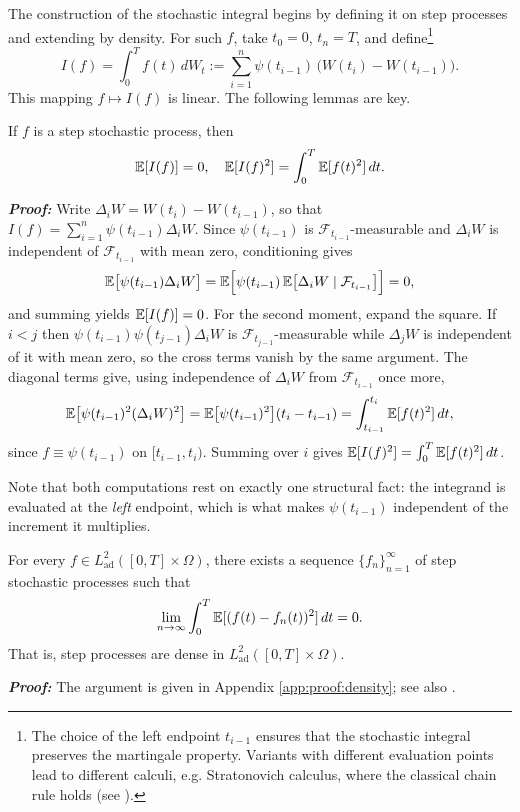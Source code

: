 \medskip

The construction of the stochastic integral begins by defining it on step processes and extending by density. For such $f$, take $t_0=0$, $t_n=T$, and define\footnote{The choice of the left endpoint $t_{i-1}$ ensures that the stochastic integral preserves the martingale property. Variants with different evaluation points lead to different calculi, e.g. Stratonovich calculus, where the classical chain rule holds (see \cite{kuo2006}).}
\begin{equation}\label{eq:integral_step}
I(f) = \int_0^T f(t)\,dW_t := \sum_{i=1}^n \psi(t_{i-1})\,\big(W(t_i)-W(t_{i-1})\big).
\end{equation}
This mapping $f \mapsto I(f)$ is linear. The following lemmas are key.

\begin{lemma}\label{lem:isometry_step}
If $f$ is a step stochastic process, then
\[
\mathbb{E}[I(f)] = 0, 
\quad 
\mathbb{E}[I(f)^2] = \int_0^T \mathbb{E}[f(t)^2]\,dt.
\]
\end{lemma}
\textbf{\textit{Proof:}} Write $\Delta_i W = W(t_i)-W(t_{i-1})$, so that
$I(f) = \sum_{i=1}^n \psi(t_{i-1})\Delta_i W$. Since $\psi(t_{i-1})$ is
$\mathcal{F}_{t_{i-1}}$-measurable and $\Delta_i W$ is independent of $\mathcal{F}_{t_{i-1}}$ with
mean zero, conditioning gives
\[
\mathbb{E}\bigl[\psi(t_{i-1})\Delta_i W\bigr]
= \mathbb{E}\Bigl[\psi(t_{i-1})\,\mathbb{E}\bigl[\Delta_i W \mid \mathcal{F}_{t_{i-1}}\bigr]\Bigr] = 0,
\]
and summing yields $\mathbb{E}[I(f)]=0$. For the second moment, expand the square. If $i<j$ then
$\psi(t_{i-1})\psi(t_{j-1})\Delta_i W$ is $\mathcal{F}_{t_{j-1}}$-measurable while $\Delta_j W$
is independent of it with mean zero, so the cross terms vanish by the same argument. The diagonal
terms give, using independence of $\Delta_i W$ from $\mathcal{F}_{t_{i-1}}$ once more,
\[
\mathbb{E}\bigl[\psi(t_{i-1})^2 (\Delta_i W)^2\bigr]
= \mathbb{E}\bigl[\psi(t_{i-1})^2\bigr](t_i - t_{i-1}) = \int_{t_{i-1}}^{t_i}\mathbb{E}[f(t)^2]\,dt,
\]
since $f \equiv \psi(t_{i-1})$ on $[t_{i-1},t_i)$. Summing over $i$ gives
$\mathbb{E}[I(f)^2] = \int_0^T \mathbb{E}[f(t)^2]\,dt$. \qedfilledtext

\medskip

\noindent Note that both computations rest on exactly one structural fact: the integrand is evaluated
at the \emph{left} endpoint, which is what makes $\psi(t_{i-1})$ independent of the increment it
multiplies.

\begin{lemma}\label{lem:density}
For every $f \in L^2_{\mathrm{ad}}([0,T]\times \Omega)$, there exists a sequence $\{f_n\}_{n=1}^\infty$ of step stochastic processes such that
\[
\lim_{n\to\infty}\int_0^T \mathbb{E}[(f(t)-f_n(t))^2]\,dt = 0.
\]
That is, step processes are dense in $L^2_{\mathrm{ad}}([0,T]\times \Omega)$.
\end{lemma}
\textbf{\textit{Proof:}} The argument is given in Appendix \ref{app:proof:density}; see also \cite[Lemma 4.3.3]{kuo2006}. \qedfilledtext

